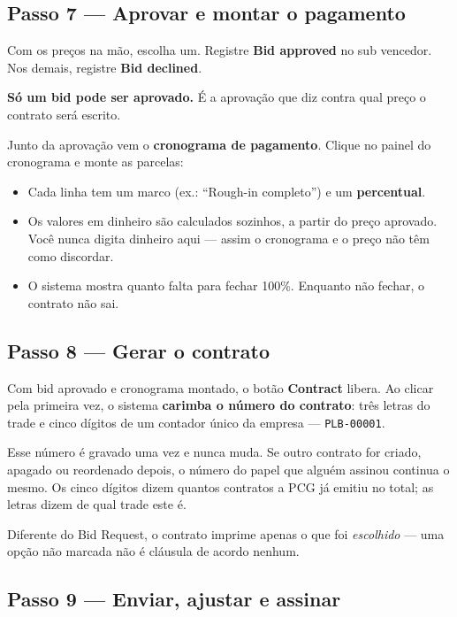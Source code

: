 \documentclass[11pt,a4paper]{article}
\newcommand{\ui}[1]{\textbf{\textsf{#1}}}
\newenvironment{aviso}
  {\par\vspace{0.7em}\noindent
   \begin{lrbox}{\avisobox}\begin{minipage}{\dimexpr\linewidth-2.4em\relax}}
  {\end{minipage}\end{lrbox}%
   \noindent\colorbox{pcglight}{\hspace{0.6em}\usebox{\avisobox}\hspace{0.6em}}%
   \vspace{0.7em}\par}
\begin{document}
\subsection{Passo 7 — Aprovar e montar o pagamento}

Com os preços na mão, escolha um. Registre \ui{Bid approved} no sub vencedor.
Nos demais, registre \ui{Bid declined}.

\textbf{Só um bid pode ser aprovado.} É a aprovação que diz contra qual preço o
contrato será escrito.

Junto da aprovação vem o \textbf{cronograma de pagamento}. Clique no painel do
cronograma e monte as parcelas:

\begin{itemize}
  \item Cada linha tem um marco (ex.: ``Rough-in completo'') e um
  \textbf{percentual}.
  \item Os valores em dinheiro são calculados sozinhos, a partir do preço
  aprovado. Você nunca digita dinheiro aqui — assim o cronograma e o preço não
  têm como discordar.
  \item O sistema mostra quanto falta para fechar 100\%. Enquanto não fechar, o
  contrato não sai.
\end{itemize}

\subsection{Passo 8 — Gerar o contrato}

Com bid aprovado e cronograma montado, o botão \ui{Contract} libera. Ao clicar
pela primeira vez, o sistema \textbf{carimba o número do contrato}: três letras
do trade e cinco dígitos de um contador único da empresa — \texttt{PLB-00001}.

\begin{aviso}
Esse número é gravado uma vez e nunca muda. Se outro contrato for criado,
apagado ou reordenado depois, o número do papel que alguém assinou continua o
mesmo. Os cinco dígitos dizem quantos contratos a PCG já emitiu no total; as
letras dizem de qual trade este é.
\end{aviso}

Diferente do Bid Request, o contrato imprime apenas o que foi \emph{escolhido} —
uma opção não marcada não é cláusula de acordo nenhum.

\subsection{Passo 9 — Enviar, ajustar e assinar}
\end{document}

